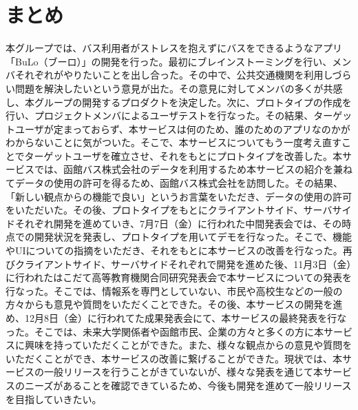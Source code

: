 \chapter{まとめ}
本グループでは、バス利用者がストレスを抱えずにバスをできるようなアプリ「BuLo（ブーロ）」の開発を行った。最初にブレインストーミングを行い、メンバそれぞれがやりたいことを出し合った。その中で、公共交通機関を利用しづらい問題を解決したいという意見が出た。その意見に対してメンバの多くが共感し、本グループの開発するプロダクトを決定した。次に、プロトタイプの作成を行い、プロジェクトメンバによるユーザテストを行なった。その結果、ターゲットユーザが定まっておらず、本サービスは何のため、誰のためのアプリなのかがわからないことに気がついた。そこで、本サービスについてもう一度考え直すことでターゲットユーザを確立させ、それをもとにプロトタイプを改善した。本サービスでは、函館バス株式会社のデータを利用するため本サービスの紹介を兼ねてデータの使用の許可を得るため、函館バス株式会社を訪問した。その結果、「新しい観点からの機能で良い」というお言葉をいただき、データの使用の許可をいただいた。その後、プロトタイプをもとにクライアントサイド、サーバサイドそれぞれ開発を進めていき、7月7日（金）に行われた中間発表会では、その時点での開発状況を発表し、プロトタイプを用いてデモを行なった。そこで、機能やUIについての指摘をいただき、それをもとに本サービスの改善を行なった。再びクライアントサイド、サーバサイドそれぞれで開発を進めた後、11月3日（金）に行われたはこだて高等教育機関合同研究発表会で本サービスについての発表を行なった。そこでは、情報系を専門としていない、市民や高校生などの一般の方々からも意見や質問をいただくことできた。その後、本サービスの開発を進め、12月8日（金）に行われてた成果発表会にて、本サービスの最終発表を行なった。そこでは、未来大学関係者や函館市民、企業の方々と多くの方に本サービスに興味を持っていただくことができた。また、様々な観点からの意見や質問をいただくことができ、本サービスの改善に繋げることができた。現状では、本サービスの一般リリースを行うことがきていないが、様々な発表を通じて本サービスのニーズがあることを確認できているため、今後も開発を進めて一般リリースを目指していきたい。
